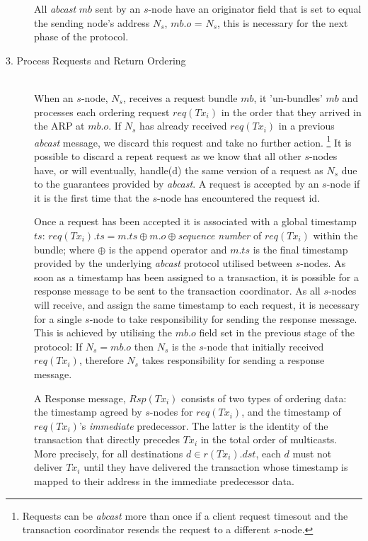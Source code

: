 \begin{description}
		All \emph{abcast} $mb$ sent by an $s$-node have an originator field that is set to equal the sending node's address $N_s$, $mb.o$ = $N_s$, this is necessary for the next phase of the protocol.  
		
		\item[3. Process Requests and Return Ordering] \hfill \\
		When an $s$-node, $N_s$, receives a request bundle $mb$, it 'un-bundles' $mb$ and processes each ordering request $req(Tx_i)$ in the order that they arrived in the ARP at $mb.o$.  If $N_s$ has already received $req(Tx_i)$ in a previous \emph{abcast} message, we discard this request and take no further action.  \footnote{Requests can be \emph{abcast} more than once if a client request timesout and the transaction coordinator resends the request to a different $s$-node.} It is possible to discard a repeat request as we know that all other $s$-nodes have, or will eventually, handle(d) the same version of a request as $N_s$ due to the guarantees provided by \emph{abcast}.  A request is accepted by an $s$-node if it is the first time that the $s$-node has encountered the request id.  
		
		Once a request has been accepted it is associated with a global timestamp $ts$: $req(Tx_i).ts = m.ts\oplus m.o \oplus$\emph{sequence number} of $req(Tx_i)$ within the bundle; where $\oplus$ is the append operator and $m.ts$ is the final timestamp provided by the underlying \emph{abcast} protocol utilised between $s$-nodes.  As soon as a timestamp has been assigned to a transaction, it is possible for a response message to be sent to the transaction coordinator.  As all $s$-nodes will receive, and assign the same timestamp to each request, it is necessary for a single $s$-node to take responsibility for sending the response message.  This is achieved by utilising the $mb.o$ field set in the previous stage of the protocol: If $N_s = mb.o$ then $N_s$ is the $s$-node that initially received $req(Tx_i)$, therefore $N_s$ takes responsibility for sending a response message.  
				
		A Response message, $Rsp(Tx_i)$ consists of two types of ordering data: the timestamp agreed by $s$-nodes for $req(Tx_i)$, and the timestamp of $req(Tx_i)$'s \emph{immediate} predecessor.  The latter is the identity of the transaction that directly precedes $Tx_i$ in the total order of multicasts.  More precisely, for all destinations $d \in r(Tx_i).dst$, each $d$ must not deliver $Tx_i$ until they have delivered the transaction whose timestamp is mapped to their address in the immediate predecessor data.  
				

\end{description}
